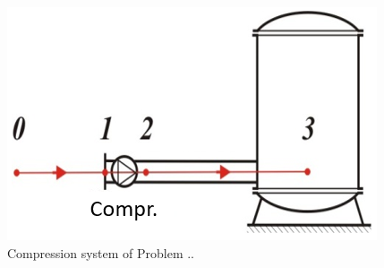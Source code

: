 \begin{figure}[ht]
\begin{center}
\includegraphics[scale=0.65]{figs/problem_1p5p9_compr_fig.png}
\caption{\label{gen_theprob}Compression system of Problem \thesection.\theprob.}
\end{center}
\end{figure}

